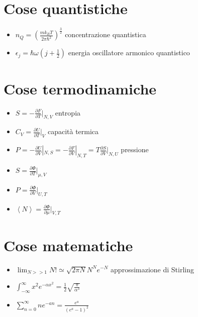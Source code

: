 \documentclass[a4paper]{article}
\begin{document}
    \section{Cose quantistiche}
        \begin{itemize}
            \item $n_Q=\left(\frac{mk_BT}{2\pi\hbar^2}\right)^{\frac{3}{2}}$ concentrazione quantistica
            \item $\epsilon_j=\hbar\omega\left(j+\frac{1}{2}\right)$ energia oscillatore armonico quantistico
        \end{itemize}

    \section{Cose termodinamiche}
        \begin{itemize}
            \item $S=-\frac{\partial F}{\partial T}|_{N,V}$ entropia
            \item $C_V=\frac{\partial U}{\partial T}|_{V}$ capacità termica
            \item $P=-\frac{\partial U}{\partial V}|_{N,S}=-\frac{\partial F}{\partial V}|_{N,T}=T\frac{\partial S}{\partial V}|_{N,U}$ pressione
            \item $S=\frac{\partial\Phi}{\partial T}|_{\mu, V}$
            \item $P=\frac{\partial\Phi}{\partial V}|_{U,T}$
            \item $\left\langle N \right\rangle=\frac{\partial\Phi}{\partial\mu}|_{V,T}$
        \end{itemize}

    \section{Cose matematiche}
        \begin{itemize}
            \item $\lim_{N>>1}{N!}\simeq\sqrt{2\pi N}N^Ne^{-N}$ approssimazione di Stirling
            \item $\int_{-\infty}^{\infty}x^2e^{-\alpha x^2}=\frac{1}{2}\sqrt{\frac{\pi}{\alpha^3}}$
            \item $\sum_{n=0}^\infty ne^{-an}=\frac{e^a}{(e^a-1)^2}$
        \end{itemize}
\end{document}
